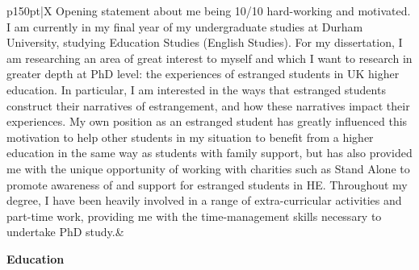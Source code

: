\documentclass[12pt, a4paper]{article}
\newcommand{\sectionheader}[1]{
	\vspace{6pt}
	{
		\noindent
		\hspace{3pt}
		\Large\textbf{#1}}}
\begin{document}
	\noindent
	\begin{tabularx}{\textwidth}{p{150pt}|X}
		\vspace{6pt}
		Opening statement about me being 10/10 hard-working and motivated. I am currently in my final year of my undergraduate studies at Durham University, studying Education Studies (English Studies). For my dissertation, I am researching an area of great interest to myself and which I want to research in greater depth at PhD level: the experiences of estranged students in UK higher education. In particular, I am interested in the ways that estranged students construct their narratives of estrangement, and how these narratives impact their experiences. My own position as an estranged student has greatly influenced this motivation to help other students in my situation to benefit from a higher education in the same way as students with family support, but has also provided me with the unique opportunity of working with charities such as Stand Alone to promote awareness of and support for estranged students in HE. Throughout my degree, I have been heavily involved in a range of extra-curricular activities and part-time work, providing me with the time-management skills necessary to undertake PhD study.&
		
		\begin{minipage}[t]{\linewidth}
			\sectionheader{Education}
			

\end{minipage}
\end{tabularx}
\end{document}
